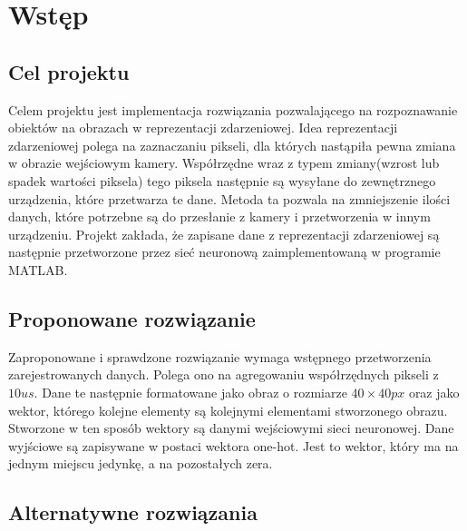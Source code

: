 \section{Wstęp}
\label{sec:wstep}

\subsection{Cel projektu}
\label{sub:celprojektu}
Celem projektu jest implementacja rozwiązania pozwalającego na rozpoznawanie obiektów na obrazach w reprezentacji zdarzeniowej. Idea reprezentacji zdarzeniowej polega na zaznaczaniu pikseli, dla których nastąpiła pewna zmiana w obrazie wejściowym kamery. Współrzędne wraz z typem zmiany(wzrost lub spadek wartości piksela) tego piksela następnie są wysyłane do zewnętrznego urządzenia, które przetwarza te dane. Metoda ta pozwala na zmniejszenie ilości danych, które potrzebne są do przesłanie z kamery i przetworzenia w innym urządzeniu. Projekt zakłada, że zapisane dane z reprezentacji zdarzeniowej są następnie przetworzone przez sieć neuronową zaimplementowaną w programie MATLAB.

\subsection{Proponowane rozwiązanie}
\label{sub:proponowanerozwiazanie}
Zaproponowane i sprawdzone rozwiązanie wymaga wstępnego przetworzenia zarejestrowanych danych. Polega ono na agregowaniu współrzędnych pikseli z \(10 \si{us}\). Dane te następnie formatowane jako obraz o rozmiarze \(40\times40\si{px}\) oraz jako wektor, którego kolejne elementy są kolejnymi elementami stworzonego obrazu. Stworzone w ten sposób wektory są danymi wejściowymi sieci neuronowej. Dane wyjściowe są zapisywane w postaci wektora one-hot. Jest to wektor, który ma na jednym miejscu jedynkę, a na pozostałych zera.

\subsection{Alternatywne rozwiązania}
\label{sub:alternatywnerozwiazania}